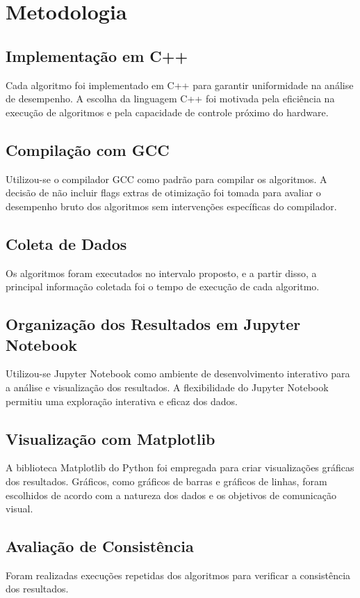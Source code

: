 \documentclass[12pt]{article}
\begin{document}
\section{Metodologia}
\subsection{Implementação em C++}
Cada algoritmo foi implementado em C++ para garantir uniformidade na análise de desempenho. A escolha da linguagem C++ foi motivada pela eficiência na execução de algoritmos e pela capacidade de controle próximo do hardware.
    
\subsection{Compilação com GCC}
Utilizou-se o compilador GCC como padrão para compilar os algoritmos. A decisão de não incluir flags extras de otimização foi tomada para avaliar o desempenho bruto dos algoritmos sem intervenções específicas do compilador.

\subsection{Coleta de Dados}
Os algoritmos foram executados no intervalo proposto, e a partir disso, a principal informação coletada foi o tempo de execução de cada algoritmo.

\subsection{Organização dos Resultados em Jupyter Notebook}
Utilizou-se Jupyter Notebook como ambiente de desenvolvimento interativo para a análise e visualização dos resultados. A flexibilidade do Jupyter Notebook permitiu uma exploração interativa e eficaz dos dados.

\subsection{Visualização com Matplotlib}
A biblioteca Matplotlib do Python foi empregada para criar visualizações gráficas dos resultados. Gráficos, como gráficos de barras e gráficos de linhas, foram escolhidos de acordo com a natureza dos dados e os objetivos de comunicação visual.

\subsection{Avaliação de Consistência}
Foram realizadas execuções repetidas dos algoritmos para verificar a consistência dos resultados.
\end{document}

